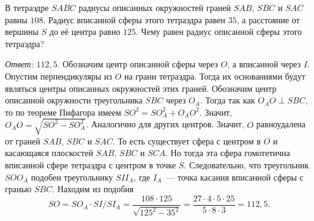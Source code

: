 В тетраэдре $SABC$ радиусы описанных окружностей граней $SAB$, $SBC$ и $SAC$
равны $108$.
Радиус вписанной сферы этого тетраэдра равен $35$, а расстояние от вершины $S$
до её центра равно $125$.
Чему равен радиус описанной сферы этого тетраэдра?

\solution
\emph{Ответ:} $112{,}5$.
Обозначим центр описанной сферы через $O$, а вписанной через $I$.
Опустим перпендикуляры из $O$ на грани тетраэдра.
Тогда их основаниями будут являться центры описанных окружностей этих граней.
Обозначим центр описанной окружности треугольника $SBC$ через $O_A$.
Тогда так как $O_AO \perp SBC$, то по теореме Пифагора имеем
$SO^2 = SO_A^2 + O_AO^2$.
Значит, $O_AO = \sqrt{SO^2 - SO_A^2}$.
Аналогично для других центров.
Значит, $O$ равноудалена от граней $SAB$, $SBC$ и $SAC$.
То есть существует сфера с центром в $O$ и касающаяся плоскостей
$SAB$, $SBC$ и $SCA$.
Но тогда эта сфера гомотетична вписанной сфере тетраэдра с центром в точке $S$.
Следовательно, что треугольник $SOO_A$ подобен треугольнику $SII_A$,
где $I_A$~--- точка касания вписанной сферы с гранью $SBC$.
Находим из подобия
\[
    SO
=
    SO_A \cdot SI / SI_A
=
    \dfrac{108 \cdot 125}{\sqrt{125^2 - 35^2}}
=
    \dfrac{27 \cdot 4 \cdot 5 \cdot 25}{5 \cdot 8 \cdot 3}
=
    112{,}5
.\]

